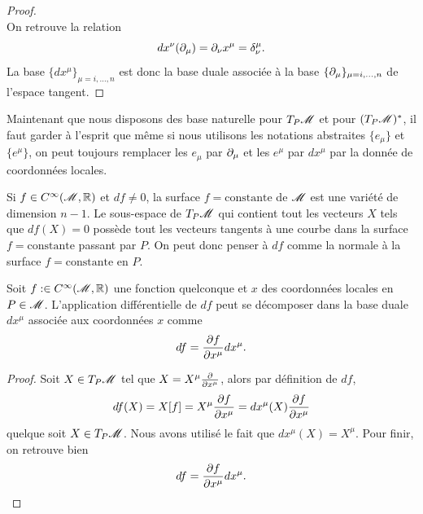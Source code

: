 \documentclass[a4paper,11pt]{report}
\begin{document}
                \begin{proof}${}$\\
                    On retrouve la relation
                    \begin{equation}
                        dx^\nu(\partial_\mu) = \partial_\nu x^\mu = \delta^\mu_\nu.
                    \end{equation}
                    La base $\{dx^\mu\}_{\mu=i,\dots,n}$ est donc la base duale associée à la base $\{\partial_\mu\}_{\mu=i,\dots,n}$ de l'espace tangent.
                \end{proof}
                
                \begin{rmk}
                    Maintenant que nous disposons des base naturelle pour $T_P\mathscr{M}$ et pour $(T_P\mathscr{M})^*$, il faut garder à l'esprit que même si nous utilisons les notations abstraites $\{e_\mu\}$ et $\{e^\mu\}$, on peut toujours remplacer les $e_\mu$ par $\partial_\mu$ et les $e^\mu$ par $dx^\mu$ par la donnée de coordonnées locales.
                \end{rmk}
                
                \begin{rmk}
                    Si $f\in C^\infty(\mathscr{M},\mathbb{R})$ et $df\neq0$, la surface $f=\text{constante}$ de $\mathscr{M}$ est une variété de dimension $n-1$. Le sous-espace de $T_P\mathscr{M}$ qui contient tout les vecteurs $X$ tels que $df(X) = 0$ possède tout les vecteurs tangents à une courbe dans la surface $f=\text{constante}$ passant par $P$. On peut donc penser à $df$ comme la normale à la surface $f=\text{constante}$ en $P$.
                \end{rmk}
                
                \begin{prop}\begin{leftbar}
                    Soit $f:\in C^\infty(\mathscr{M},\mathbb{R})$ une fonction quelconque et $x$ des coordonnées locales en $P\in\mathscr{M}$. L'application différentielle de $df$ peut se décomposer dans la base duale $dx^\mu$ associée aux coordonnées $x$ comme
                    \begin{equation}
                        df = \pdv{f}{x^\mu}dx^\mu.
                    \end{equation}
                \end{leftbar}\end{prop}
                
                \begin{proof}
                    Soit $X\in T_P\mathscr{M}$ tel que $X = X^\mu\pdv{}{x^\mu}$, alors par définition de $df$,
                    \begin{equation}
                        df(X) = X[f] = X^\mu\pdv{f}{x^\mu} = dx^\mu(X)\pdv{f}{x^\mu}
                    \end{equation}
                    quelque soit $X\in T_P\mathscr{M}$. Nous avons utilisé le fait que $dx^\mu(X) = X^\mu$. Pour finir, on retrouve bien
                    \begin{equation}
                        df = \pdv{f}{x^\mu}dx^\mu.
                    \end{equation}
                \end{proof}
\end{document}
